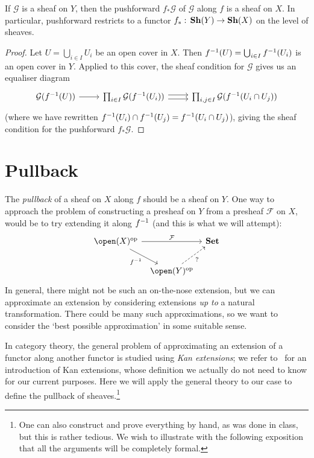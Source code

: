 \begin{lem}
If \(\mathcal G\) is a sheaf on \(Y\), then the pushforward \(f_*\mathcal G\) of \(\mathcal G\) along \(f\) is a sheaf on \(X\).
In particular, pushforward restricts to a functor \(f_*\colon\catSheaf(Y)\to\catSheaf(X)\) on the level of sheaves.
\end{lem}
\begin{proof}
Let \(U=\bigcup_{i\in I}U_i\) be an open cover in \(X\).
Then \(f^{-1}(U) = \bigcup_{i\in I}f^{-1}(U_i)\) is an open cover in \(Y\).
Applied to this cover, the sheaf condition for \(\mathcal G\) gives us an equaliser diagram
\begin{equation*}
  \begin{tikzcd}
    \mathcal G(f\inv(U)) \ar[r] & \prod_{i\in I}\mathcal G(f\inv(U_i)) \ar[r, shift left] \ar[r, shift right] & \prod_{i,j\in I}\mathcal G(f\inv(U_i\cap U_j))
  \end{tikzcd}
\end{equation*}
(where we have rewritten \(f^{-1}(U_i)\cap f^{-1}(U_j)=f^{-1}(U_i\cap U_j)\)), giving the sheaf condition for the pushforward \(f_*\mathcal G\).
\end{proof}

\section{Pullback}
\noindent
The \emph{pullback} of a sheaf on \(X\) along \(f\) should be a sheaf on \(Y\).
One way to approach the problem of constructing a presheaf on \(Y\) from a presheaf \(\mathcal F\) on \(X\), would be to try extending it along \(f^{-1}\) (and this is what we will attempt):
\begin{equation*}
  \begin{tikzcd}[column sep=tiny]
    \open(X)\opp \ar[rr, "\mathcal F"] \ar[rd, "f\inv"'] & & \catSet \\
    & \open(Y)\opp \ar[ru, dashed, "?"']
  \end{tikzcd}
\end{equation*}
In general, there might not be such an on-the-nose extension, but we can approximate an extension by considering extensions \emph{up to} a natural transformation.
There could be many such approximations, so we want to consider the `best possible approximation' in some suitable sense.

In category theory, the general problem of approximating an extension of a functor along another functor is studied using \emph{Kan extensions}; we refer to~\cite[Chapter~6]{riehlCategoryTheoryContext2016} for an introduction of Kan extensions, whose definition we actually do not need to know for our current purposes.
Here we will apply the general theory to our case to define the pullback of sheaves.\footnote{One can also construct and prove everything by hand, as was done in class, but this is rather tedious. We wish to illustrate with the following exposition that all the arguments will be completely formal.}

